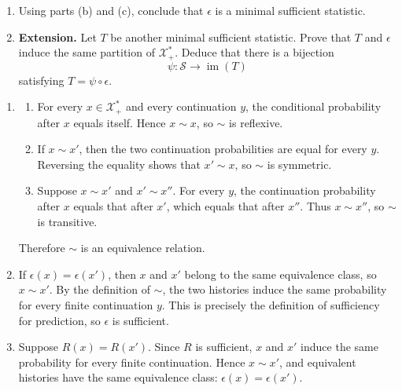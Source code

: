\documentclass[11pt]{article}
\begin{document}
\begin{exercise}
\begin{enumerate}
    \item Using parts (b) and (c), conclude that $\epsilon$ is a minimal
      sufficient statistic.

    \item \textbf{Extension.} Let $T$ be another minimal sufficient
      statistic. Prove that $T$ and $\epsilon$ induce the same partition of
      $\mathcal X_+^*$. Deduce that there is a bijection
      \[
        \psi:\mathcal S\to\operatorname{im}(T)
      \]
      satisfying $T=\psi\circ\epsilon$.
  \end{enumerate}
\end{exercise}
\begin{solution}[ex:p2-2]
    \begin{enumerate}
      \item
        \begin{enumerate}
          \item For every $x\in\mathcal X_+^*$ and every continuation $y$,
            the conditional probability after $x$ equals itself. Hence
            $x\sim x$, so $\sim$ is reflexive.

          \item If $x\sim x'$, then the two continuation probabilities are
            equal for every $y$. Reversing the equality shows that
            $x'\sim x$, so $\sim$ is symmetric.

          \item Suppose $x\sim x'$ and $x'\sim x''$. For every $y$, the
            continuation probability after $x$ equals that after $x'$, which
            equals that after $x''$. Thus $x\sim x''$, so $\sim$ is
            transitive.
        \end{enumerate}
        Therefore $\sim$ is an equivalence relation.

      \item If $\epsilon(x)=\epsilon(x')$, then $x$ and $x'$ belong to the
        same equivalence class, so $x\sim x'$. By the definition of $\sim$,
        the two histories induce the same probability for every finite
        continuation $y$. This is precisely the definition of sufficiency for
        prediction, so $\epsilon$ is sufficient.

      \item Suppose $R(x)=R(x')$. Since $R$ is sufficient, $x$ and $x'$
        induce the same probability for every finite continuation. Hence
        $x\sim x'$, and equivalent histories have the same equivalence class:
        $\epsilon(x)=\epsilon(x')$.


\end{enumerate}
\end{solution}
\end{document}
